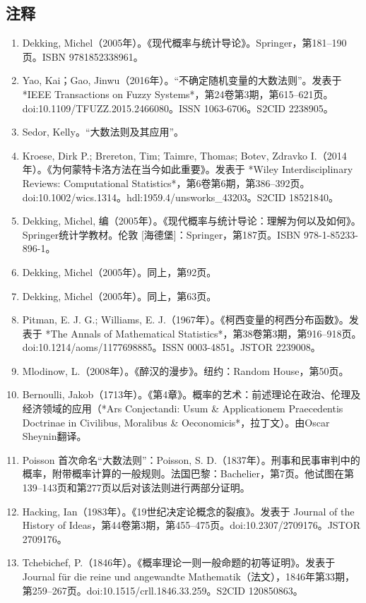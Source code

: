 \subsection{注释}
\begin{enumerate}
\item Dekking, Michel（2005年）。《现代概率与统计导论》。Springer，第181–190页。ISBN 9781852338961。
\item Yao, Kai；Gao, Jinwu（2016年）。“不确定随机变量的大数法则”。发表于 *IEEE Transactions on Fuzzy Systems*，第24卷第3期，第615–621页。doi:10.1109/TFUZZ.2015.2466080。ISSN 1063-6706。S2CID 2238905。
\item  Sedor, Kelly。“大数法则及其应用”。
\item Kroese, Dirk P.; Brereton, Tim; Taimre, Thomas; Botev, Zdravko I.（2014年）。《为何蒙特卡洛方法在当今如此重要》。发表于 *Wiley Interdisciplinary Reviews: Computational Statistics*，第6卷第6期，第386–392页。doi:10.1002/wics.1314。hdl:1959.4/unsworks\_43203。S2CID 18521840。
\item Dekking, Michel, 编（2005年）。《现代概率与统计导论：理解为何以及如何》。Springer统计学教材。伦敦 [海德堡]：Springer，第187页。ISBN 978-1-85233-896-1。
\item Dekking, Michel（2005年）。同上，第92页。
\item Dekking, Michel（2005年）。同上，第63页。
\item Pitman, E. J. G.; Williams, E. J.（1967年）。《柯西变量的柯西分布函数》。发表于 *The Annals of Mathematical Statistics*，第38卷第3期，第916–918页。doi:10.1214/aoms/1177698885。ISSN 0003-4851。JSTOR 2239008。
\item Mlodinow, L.（2008年）。《醉汉的漫步》。纽约：Random House，第50页。
\item Bernoulli, Jakob（1713年）。《第4章》。概率的艺术：前述理论在政治、伦理及经济领域的应用（*Ars Conjectandi: Usum & Applicationem Praecedentis Doctrinae in Civilibus, Moralibus & Oeconomicis*，拉丁文）。由Oscar Sheynin翻译。
\item Poisson 首次命名“大数法则”：Poisson, S. D.（1837年）。刑事和民事审判中的概率，附带概率计算的一般规则。法国巴黎：Bachelier，第7页。他试图在第139–143页和第277页以后对该法则进行两部分证明。
\item Hacking, Ian（1983年）。《19世纪决定论概念的裂痕》。发表于 Journal of the History of Ideas，第44卷第3期，第455–475页。doi:10.2307/2709176。JSTOR 2709176。
\item Tchebichef, P.（1846年）。《概率理论一则一般命题的初等证明》。发表于 Journal für die reine und angewandte Mathematik（法文），1846年第33期，第259–267页。doi:10.1515/crll.1846.33.259。S2CID 120850863。

\end{enumerate}
